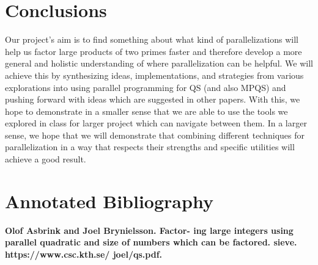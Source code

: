 \documentclass[11pt,twocolumn]{article}
\begin{document}
\section{Conclusions} \label{conc} Our project's aim is to find something about what kind of parallelizations will help us factor large products of two primes faster and therefore develop a more general and holistic understanding of where parallelization can be helpful. We will achieve this by synthesizing ideas, implementations, and strategies from various explorations into using parallel programming for QS (and also MPQS) and pushing forward with ideas which are suggested in other papers. With this, we hope to demonstrate in a smaller sense that we are able to use the tools we explored in class for larger project which can navigate between them. In a larger sense, we hope that we will demonstrate that combining different techniques for parallelization in a way that respects their strengths and specific utilities will achieve a good result.




\newpage

\onecolumn
\section*{Annotated Bibliography}\label{annon}

\textbf{Olof Asbrink and Joel Brynielsson. Factor-
ing large integers using parallel quadratic
and size of numbers which can be factored.
sieve. https://www.csc.kth.se/ joel/qs.pdf.} \\
\end{document}
